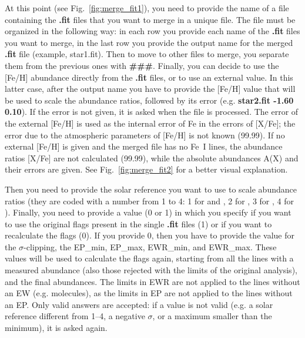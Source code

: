 \documentclass[modern]{aastex701}
\begin{document}
At this point (see Fig.~\ref{fig:merge_fit1}), you need to provide the name of a file containing the {\bf .fit} files that you want to merge in a unique file. 
The file must be organized in the following way: in each row you provide each name of the {\bf .fit} files you want to merge, in the last row you provide the output name for the merged {\bf .fit} file (example, star1.fit). Then to move to other files to merge, you separate them from the previous ones with {\bf \#\#\#}.
Finally, you can decide to use the [Fe/H] abundance directly from the {\bf .fit} files, or to use an external value. In this latter case, after the output name you have to provide the [Fe/H] value that will be used to scale the abundance ratios, followed by its error (e.g. {\bf star2.fit  -1.60  0.10}). If the error is not given, it is asked when the file is processed. The error of the external [Fe/H] is used as the internal error of Fe in the errors of [X/Fe]; the error due to the atmospheric parameters of [Fe/H] is not known (99.99). If no external [Fe/H] is given and the merged file has no Fe~I lines, the abundance ratios [X/Fe] are not calculated (99.99), while the absolute abundances A(X) and their errors are given.
See Fig.~\ref{fig:merge_fit2} for a better visual explanation.

Then you need to provide the solar reference you want to use to scale abundance ratios (they are coded with a number from 1 to 4: 1 for \citet{caffau_11} and \citet{lodders_10}, 2 for \citet{grevesse_98}, 3 for \citet{magg_22}, 4 for \citet{asplund_09}).
Finally, you need to provide a value (0 or 1) in which you specify if you want to use the original flags present in the single {\bf .fit} files (1) or if you want to recalculate the flags (0).
If you provide 0, then you have to provide the value for the $\sigma$-clipping, the EP\_min, EP\_max, EWR\_min, and EWR\_max. These values will be used to calculate the flags again, starting from all the lines with a measured abundance (also those rejected with the limits of the original analysis), and the final abundances. The limits in EWR are not applied to the lines without an EW (e.g. molecules), as the limits in EP are not applied to the lines without an EP. Only valid answers are accepted: if a value is not valid (e.g. a solar reference different from 1--4, a negative $\sigma$, or a maximum smaller than the minimum), it is asked again.
\end{document}
